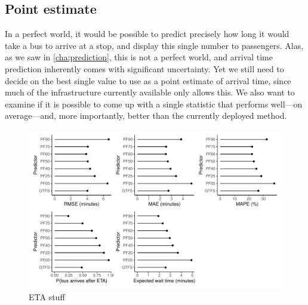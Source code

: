 \subsection{Point estimate}
\label{sec:etas-point}

In a perfect world, it would be possible to predict precisely how long it would take a bus to arrive at a stop, and display this single number to passengers. Alas, as we saw in \cref{cha:prediction}, this is not a perfect world, and arrival time prediction inherently comes with significant uncertainty. Yet we still need to decide on the best single value to use as a point estimate of arrival time, since much of the infrastructure currently available only allows this. We also want to examine if it is possible to come up with a single statistic that performs well---on average---and, more importantly, better than the currently deployed method.





\begin{knitrout}\small
{}\color{fgcolor}\begin{figure}

{\centering \includegraphics[width=\textwidth]{figure/eta_overall_results-1} 

}

\caption[ETA stuff]{ETA stuff}\label{fig:eta_overall_results}
\end{figure}


\end{knitrout}


